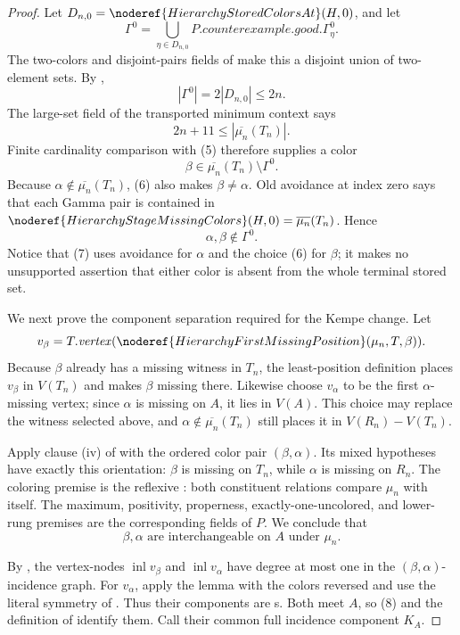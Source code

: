 \begin{proof}
Let \(D_{n,0}=\noderef{HierarchyStoredColorsAt}(H,0)\), and let
\[
 \Gamma^0=\bigcup_{\eta\in D_{n,0}}
                  P.\mathit{counterexample}.\mathit{good}.\Gamma^0_\eta .
\]
The two-colors and disjoint-pairs fields of
 make this a disjoint union of two-element sets.
By ,
\[
                 |\Gamma^0|=2|D_{n,0}|\leq2n.                 \tag{5}
\]
The large-set field of the transported minimum context says
\[
                   2n+11\leq|\overline{\mu_n}(T_n)|.
\]
Finite cardinality comparison with (5) therefore supplies a color
\[
          \beta\in\overline{\mu_n}(T_n)\setminus\Gamma^0.      \tag{6}
\]
Because \(\alpha\notin\overline{\mu_n}(T_n)\), (6) also makes
\(\beta\ne\alpha\).  Old avoidance at index zero says that each Gamma
pair is contained in
\(\noderef{HierarchyStageMissingColors}(H,0)
 =\overline{\mu_n}(T_n)\).  Hence
\[
                         \alpha,\beta\notin\Gamma^0.           \tag{7}
\]
Notice that (7) uses avoidance for \(\alpha\) and the choice (6) for
\(\beta\); it makes no unsupported assertion that either color is absent
from the whole terminal stored set.

We next prove the component separation required for the Kempe change.
Let
\[
 v_\beta=T.\mathit{vertex}
   (\noderef{HierarchyFirstMissingPosition}(\mu_n,T,\beta)).
\]
Because \(\beta\) already has a missing witness in \(T_n\), the
least-position definition places \(v_\beta\) in \(V(T_n)\) and makes
\(\beta\) missing there.  Likewise choose \(v_\alpha\) to be the first
\(\alpha\)-missing vertex; since \(\alpha\) is missing on \(A\), it lies
in \(V(A)\).  This choice may replace the witness selected above, and
\(\alpha\notin\overline{\mu_n}(T_n)\) still places it in
\(V(R_n)-V(T_n)\).

Apply clause (iv) of  with the ordered color pair
\((\beta,\alpha)\).  Its mixed hypotheses have exactly this orientation:
\(\beta\) is missing on \(T_n\), while \(\alpha\) is missing on \(R_n\).
The coloring premise is the reflexive
: both constituent
 relations compare \(\mu_n\) with itself.
The maximum, positivity, properness, exactly-one-uncolored, and lower-rung
premises are the corresponding fields of \(P\).  We conclude that
\[
          \beta,\alpha\text{ are interchangeable on }A
          \text{ under }\mu_n.                                \tag{8}
\]

By , the vertex-nodes
\(\operatorname{inl}v_\beta\) and
\(\operatorname{inl}v_\alpha\) have degree at most one in the
\((\beta,\alpha)\)-incidence graph.  For \(v_\alpha\), apply the lemma
with the colors reversed and use the literal symmetry of
.  Thus their components are
s.  Both meet \(A\), so (8) and the
definition of  identify them.  Call their
common full incidence component \(K_A\).


\end{proof}
